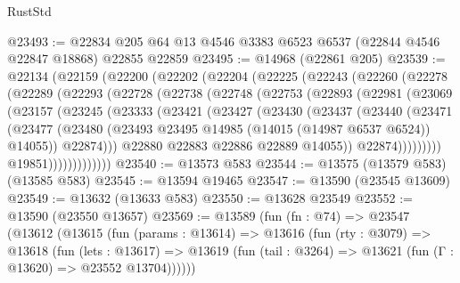 \begin{lexlean}{RustStd}
\begin{coremodule}
@23493 := @22834 @205 @64 @13 @4546 @3383 @6523 @6537 (@22844 @4546 @22847 @18868) @22855 @22859
@23495 := @14968 (@22861 @205)
@23539 := @22134
    (@22159
      (@22200
        (@22202
          (@22204
            (@22225
              (@22243
                (@22260
                  (@22278
                    (@22289
                      (@22293
                        (@22728
                          (@22738
                            (@22748
                              (@22753
                                (@22893
                                  (@22981
                                    (@23069
                                      (@23157
                                        (@23245
                                          (@23333
                                            (@23421
                                              (@23427
                                                (@23430
                                                  (@23437
                                                    (@23440
                                                      (@23471
                                                        (@23477
                                                          (@23480
                                                            (@23493
                                                              @23495
                                                              @14985
                                                              (@14015 (@14987 @6537 @6524))
                                                              @14055))
                                                          @22874)))
                                                    @22880
                                                    @22883
                                                    @22886
                                                    @22889
                                                    @14055))
                                                @22874)))))))))
                              @19851)))))))))))))
@23540 := @13573 @583
@23544 := @13575 (@13579 @583) (@13585 @583)
@23545 := @13594 @19465
@23547 := @13590 (@23545 @13609)
@23549 := @13632 (@13633 @583)
@23550 := @13628 @23549
@23552 := @13590 (@23550 @13657)
@23569 := @13589
    (fun (fn : @74) =>
    @23547
      (@13612
        (@13615
          (fun (params : @13614) =>
          @13616
            (fun (rty : @3079) =>
            @13618
              (fun (lets : @13617) =>
              @13619 (fun (tail : @3264) => @13621 (fun (Γ : @13620) => @23552 @13704))))))

\end{coremodule}
\end{lexlean}
